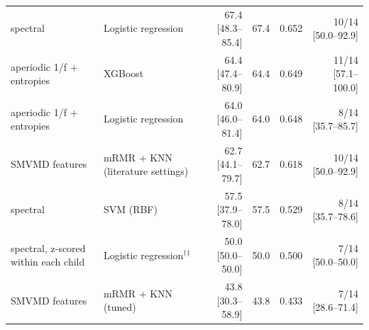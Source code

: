 \begin{tabular}{llrrrr}
spectral & Logistic regression & 67.4 [48.3--85.4] & 67.4 & 0.652 & 10/14 [50.0--92.9] \\
aperiodic 1/f + entropies & XGBoost & 64.4 [47.4--80.9] & 64.4 & 0.649 & 11/14 [57.1--100.0] \\
aperiodic 1/f + entropies & Logistic regression & 64.0 [46.0--81.4] & 64.0 & 0.648 & 8/14 [35.7--85.7] \\
SMVMD features & mRMR + KNN (literature settings) & 62.7 [44.1--79.7] & 62.7 & 0.618 & 10/14 [50.0--92.9] \\
spectral & SVM (RBF) & 57.5 [37.9--78.0] & 57.5 & 0.529 & 8/14 [35.7--78.6] \\
spectral, z-scored within each child & Logistic regression$^\dagger$$^\ddagger$ & 50.0 [50.0--50.0] & 50.0 & 0.500 & 7/14 [50.0--50.0] \\
SMVMD features & mRMR + KNN (tuned) & 43.8 [30.3--58.9] & 43.8 & 0.433 & 7/14 [28.6--71.4] \\
\hline
\end{tabular}
